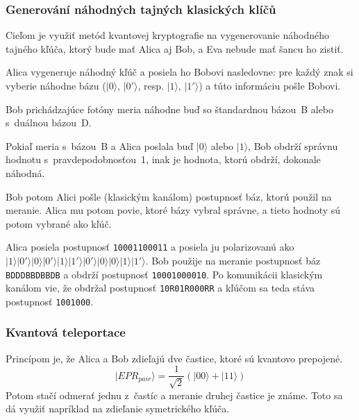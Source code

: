 \subsubsection{Generování náhodných tajných klasických klíčů}
Cieľom je využiť metód kvantovej kryptografie na vygenerovanie
náhodného tajného kľúča, ktorý bude mať Alica aj Bob, a Eva
nebude mať šancu ho zistiť.

Alica vygeneruje náhodný kľúč a posiela ho Bobovi nasledovne:
pre každý znak si vyberie náhodne bázu ($|0\rangle$, $|0'\rangle$,
resp. $|1\rangle$, $|1'\rangle$) a túto informáciu pošle Bobovi.

Bob prichádzajúce fotóny meria náhodne buď so štandardnou bázou~B
alebo s~duálnou bázou~D.

Pokiaľ meria s~bázou~B a Alica poslala buď $|0\rangle$ alebo $|1\rangle$,
Bob obdrží správnu hodnotu s~pravdepodobnosťou~1, inak je hodnota,
ktorú obdrží, dokonale náhodná.

Bob potom Alici pošle (klasickým kanálom) postupnosť báz, ktorú použil 
na meranie. Alica mu potom povie, ktoré bázy vybral správne,
a tieto hodnoty sú potom vybrané ako kľúč.

\begin{example}
	Alica posiela postupnosť \verb|10001100011| a posiela ju polarizovanú
	ako $|1\rangle|0'\rangle|0\rangle|0'\rangle|1\rangle|1'\rangle|0'\rangle|0\rangle|0\rangle|1\rangle|1'\rangle$.
	Bob použije na meranie postupnosť báz \verb|BDDDBBDBBDB| a obdrží
	postupnosť \verb|10001000010|.
	Po komunikácii klasickým kanálom vie, že obdržal postupnosť \verb|10R01R000RR|
	a kľúčom sa teda stáva postupnosť \verb|1001000|.
\end{example}

\subsubsection{Kvantová teleportace}
Princípom je, že Alica a Bob zdieľajú dve častice, ktoré
sú kvantovo prepojené.
\[
	|EPR_{pair}\rangle=\frac{1}{\sqrt{2}}(|00\rangle+|11\rangle)
\]
Potom stačí odmerať jednu z~častíc a meranie druhej častice je známe.
Toto sa dá využiť napríklad na zdieľanie symetrického kľúča.
